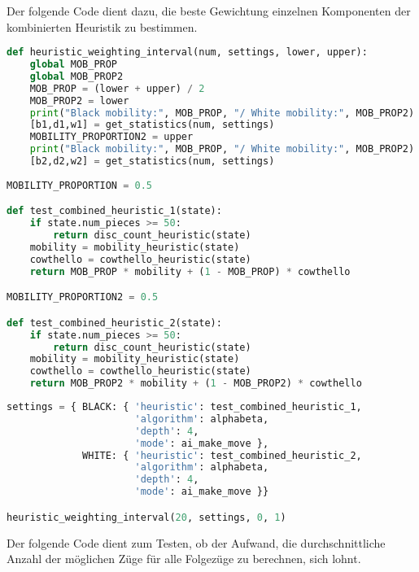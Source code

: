 Der folgende Code dient dazu, die beste Gewichtung einzelnen Komponenten
der kombinierten Heuristik zu bestimmen.

\begin{lstlisting}[language=Python]
def heuristic_weighting_interval(num, settings, lower, upper):
    global MOB_PROP
    global MOB_PROP2
    MOB_PROP = (lower + upper) / 2
    MOB_PROP2 = lower
    print("Black mobility:", MOB_PROP, "/ White mobility:", MOB_PROP2)
    [b1,d1,w1] = get_statistics(num, settings)
    MOBILITY_PROPORTION2 = upper
    print("Black mobility:", MOB_PROP, "/ White mobility:", MOB_PROP2)
    [b2,d2,w2] = get_statistics(num, settings)
    
MOBILITY_PROPORTION = 0.5

def test_combined_heuristic_1(state):
    if state.num_pieces >= 50:
        return disc_count_heuristic(state)
    mobility = mobility_heuristic(state)
    cowthello = cowthello_heuristic(state)
    return MOB_PROP * mobility + (1 - MOB_PROP) * cowthello

MOBILITY_PROPORTION2 = 0.5

def test_combined_heuristic_2(state):
    if state.num_pieces >= 50:
        return disc_count_heuristic(state)
    mobility = mobility_heuristic(state)
    cowthello = cowthello_heuristic(state)
    return MOB_PROP2 * mobility + (1 - MOB_PROP2) * cowthello
\end{lstlisting}

\begin{lstlisting}[language=Python]
settings = { BLACK: { 'heuristic': test_combined_heuristic_1,
                      'algorithm': alphabeta,
                      'depth': 4,
                      'mode': ai_make_move },
             WHITE: { 'heuristic': test_combined_heuristic_2,
                      'algorithm': alphabeta,
                      'depth': 4,
                      'mode': ai_make_move }}

heuristic_weighting_interval(20, settings, 0, 1)
\end{lstlisting}

Der folgende Code dient zum Testen, ob der Aufwand, die
durchschnittliche Anzahl der möglichen Züge für alle Folgezüge zu
berechnen, sich lohnt.

